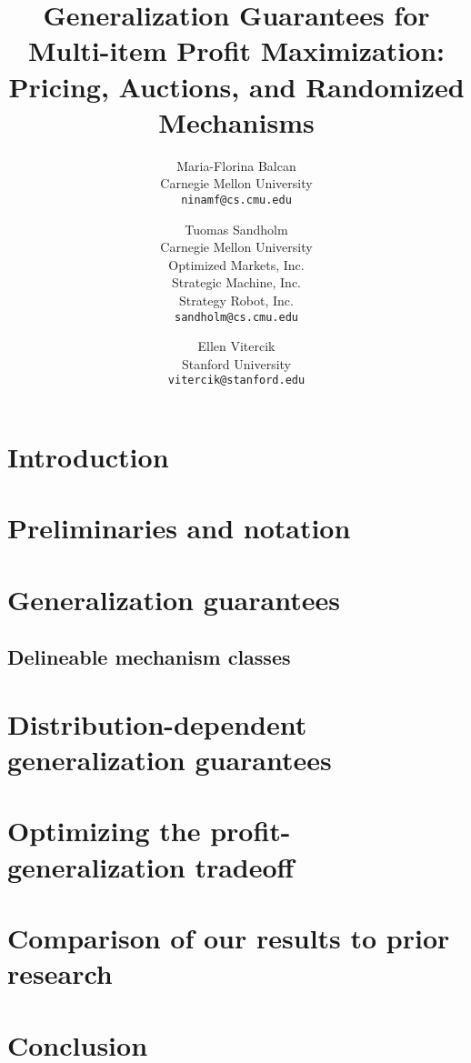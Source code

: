 \documentclass[11pt]{article}
\title{Generalization Guarantees for Multi-item Profit Maximization:\\Pricing, Auctions, and Randomized Mechanisms}
\author{
	Maria-Florina Balcan \\ \small Carnegie Mellon University \\ \small \texttt{ninamf@cs.cmu.edu}
	\and 
	Tuomas Sandholm \\ \small Carnegie Mellon University \\
	\small Optimized Markets, Inc.\\
	\small Strategic Machine, Inc.\\
	\small Strategy Robot, Inc.\\
	\small \texttt{sandholm@cs.cmu.edu}
	\and 
	Ellen Vitercik \\ \small Stanford University \\ \small \texttt{vitercik@stanford.edu}}
\begin{document}
	\maketitle
	
	\begin{abstract}
		
	\end{abstract}

\section{Introduction}



\section{Preliminaries and notation}\label{sec:prelim}


\section{Generalization guarantees}\label{SEC:MAIN}

\subsection{Delineable mechanism classes}\label{sec:delineable}


\section{Distribution-dependent generalization guarantees}\label{SEC:DATA}


\section{Optimizing the profit-generalization tradeoff}\label{SEC:SPM}


\section{Comparison of our results to prior research}\label{SEC:COMPARISON}


\section{Conclusion}

\end{document}
